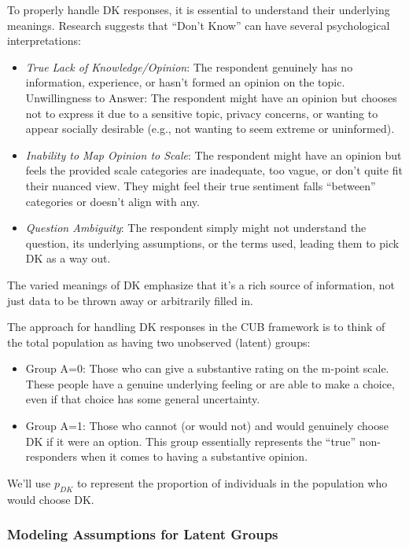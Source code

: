 \documentclass[
  letterpaper,
  DIV=11,
  numbers=noendperiod]{scrartcl}
\providecommand{\tightlist}{%
  \setlength{\itemsep}{0pt}\setlength{\parskip}{0pt}}\usepackage{longtable,booktabs,array}
\begin{document}
To properly handle DK responses, it is essential to understand their
underlying meanings. Research suggests that ``Don't Know'' can have
several psychological interpretations:

\begin{itemize}
\tightlist
\item
  \emph{True Lack of Knowledge/Opinion}: The respondent genuinely has no
  information, experience, or hasn't formed an opinion on the topic.
  Unwillingness to Answer: The respondent might have an opinion but
  chooses not to express it due to a sensitive topic, privacy concerns,
  or wanting to appear socially desirable (e.g., not wanting to seem
  extreme or uninformed).
\item
  \emph{Inability to Map Opinion to Scale}: The respondent might have an
  opinion but feels the provided scale categories are inadequate, too
  vague, or don't quite fit their nuanced view. They might feel their
  true sentiment falls ``between'' categories or doesn't align with any.
\item
  \emph{Question Ambiguity}: The respondent simply might not understand
  the question, its underlying assumptions, or the terms used, leading
  them to pick DK as a way out.
\end{itemize}

The varied meanings of DK emphasize that it's a rich source of
information, not just data to be thrown away or arbitrarily filled in.

The approach for handling DK responses in the CUB framework is to think
of the total population as having two unobserved (latent) groups:

\begin{itemize}
\item
  Group A=0: Those who can give a substantive rating on the m-point
  scale. These people have a genuine underlying feeling or are able to
  make a choice, even if that choice has some general uncertainty.
\item
  Group A=1: Those who cannot (or would not) and would genuinely choose
  DK if it were an option. This group essentially represents the
  ``true'' non-responders when it comes to having a substantive opinion.
\end{itemize}

We'll use \(p_{DK}\) to represent the proportion of individuals in the
population who would choose DK.

\hypertarget{modeling-assumptions-for-latent-groups}{%
\subsubsection{Modeling Assumptions for Latent
Groups}\label{modeling-assumptions-for-latent-groups}}
\end{document}

